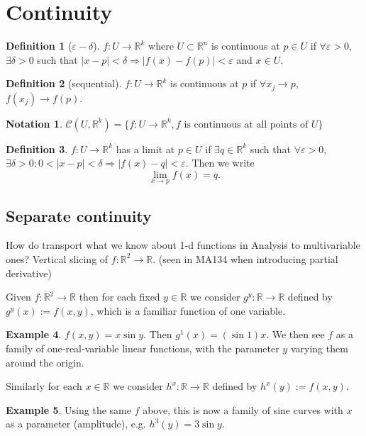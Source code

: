 \documentclass[a4paper]{article}
\theoremstyle{definition}
\newtheorem{defn}{Definition}[subsection]
\newtheorem{eg}[defn]{Example}
\newtheorem*{notation}{Notation}
\begin{document}
\section{Continuity}
\begin{defn} [$\varepsilon-\delta$]
	$f:U\rightarrow \mathbb R^k$ where $U \subset \mathbb R ^n$ is continuous at $p\in U$ if $\forall \varepsilon >0$, $\exists \delta >0$ such that $|x-p|<\delta \Rightarrow |f(x)-f(p)| < \varepsilon$ and $x\in U$.
\end{defn}
\begin{defn} [sequential]
	$f:U\rightarrow \mathbb R^k$ is continuous at $p$ if $\forall x_j \rightarrow p$, $f(x_j) \rightarrow f(p)$.
\end{defn}
\begin{notation}
	$\mathcal C (U, \mathbb R^k) = \{ f: U \rightarrow \mathbb R^k, f\text{ is continuous at all points of }U \}$
\end{notation}
\begin{defn}
	$f:U\rightarrow \mathbb R^k$ has a limit at $p\in U$ if $\exists q \in \mathbb R^k$ such that $\forall \varepsilon >0$, $\exists \delta >0 : 0<|x-p|<\delta \Rightarrow |f(x)-q|<\varepsilon$. Then we write
\[
\lim_{x\rightarrow p} f(x)=q.
\]
\end{defn}
\subsection{Separate continuity}
How do transport what we know about 1-d functions in Analysis to multivariable ones? Vertical slicing of $f: \mathbb R^2 \rightarrow \mathbb R$. (seen in MA134 when introducing partial derivative)

Given $f: \mathbb R^2 \rightarrow \mathbb R$ then for each fixed $y \in \mathbb R$ we consider $g^y : \mathbb R \rightarrow \mathbb R$ defined by $g^y(x) := f(x,y)$, which is a familiar function of one variable.

\begin{eg}
	$f(x,y)=x \sin y.$ Then $g^1(x) = (\sin 1) x$. We then see $f$ as a family of one-real-variable linear functions, with the parameter $y$ varying them around the origin.
\end{eg}

Similarly for each $x\in \mathbb R$ we consider $h^x : \mathbb R \rightarrow \mathbb R$ defined by $h^x(y) := f(x,y).$

\begin{eg}
	Using the same $f$ above, this is now a family of sine curves with $x$ as a parameter (amplitude), e.g. $h^3(y)=3\sin y.$
\end{eg}
\end{document}
